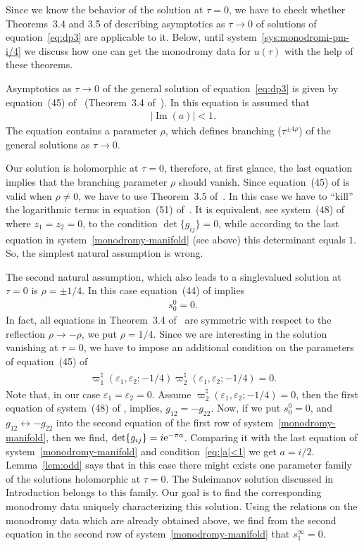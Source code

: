 \documentclass[pdftex]{sigma}
\numberwithin{equation}{section}
\begin{document}
Since we know the behavior of the solution at $\tau=0$, we have to check whether Theorems~3.4 and 3.5 of \cite{KV2004} describing asymptotics as $\tau\to0$
of solutions of equation~\eqref{eq:dp3} are applicable to it. Below, until system~\eqref{sys:monodromi-pm-i/4}
we discuss how one can get the monodromy data for $u(\tau)$ with the help of these theorems.

Asymptotics as $\tau\to0$ of the general solution of equation~\eqref{eq:dp3} is given by equation~(45)
of~\cite{KV2004} (Theorem~3.4 of~\cite{KV2004}). In this equation is assumed that
\begin{gather}\label{eq:|a|<1}
|\operatorname{Im}(a)|<1.
\end{gather}
The equation contains a parameter $\rho$, which defines branching ($\tau^{\pm4\rho}$) of
the general solutions as $\tau\to0$.

Our solution is holomorphic at $\tau=0$, therefore, at first glance,
the last equation implies that the branching parameter $\rho$ should vanish.
Since equation~(45) of \cite{KV2004} is valid when $\rho\neq0$, we have to use Theorem~3.5 of~\cite{KV2004}.
In this case we have to ``kill'' the logarithmic terms in equation~(51) of~\cite{KV2004}. It is equivalent,
see system~(48) of \cite{KV2004} where $z_1=z_2=0$, to the condition $\det\{g_{ij}\}=0$, while according to the last
equation in system~\eqref{monodromy-manifold} (see above) this determinant equals $1$. So, the simplest natural
assumption is wrong.

The second natural assumption, which also leads to a singlevalued solution at $\tau=0$ is $\rho=\pm1/4$.
In this case equation~(44) of \cite{KV2004} implies
\begin{gather*}%
s_0^0=0.
\end{gather*}
In fact, all equations in Theorem~3.4 of~\cite{KV2004} are symmetric with respect to the reflection $\rho\to-\rho$,
we put $\rho=1/4$. Since we are interesting in the solution vanishing at $\tau=0$, we have to impose an
additional condition on the parameters of equation~(45) of~\cite{KV2004}
\begin{gather*}
\varpi_1^\natural(\varepsilon_1,\varepsilon_2;-1/4)\varpi_2^\natural(\varepsilon_1,\varepsilon_2;-1/4)=0.
\end{gather*}
Note that, in our case $\varepsilon_1=\varepsilon_2=0$.
Assume $\varpi_2^\natural(\varepsilon_1,\varepsilon_2;-1/4)=0$, then the first equation of system~(48)
of \cite{KV2004}, implies, $g_{12}=-g_{22}$. Now, if we put $s_0^0=0$, and $g_{12}\leftrightarrow-g_{22}$
into the second equation of the first row of system~\eqref{monodromy-manifold}, then we find,
$\det\{g_{ij}\}=i{\rm e}^{-\pi a}$. Comparing it with the last equation of system~\eqref{monodromy-manifold}
and condition~\eqref{eq:|a|<1} we get $a=i/2$. Lemma~\ref{lem:odd} says that in this case there might exists
one parameter family of the solutions holomorphic at $\tau=0$. The Suleimanov solution discussed in Introduction
belongs to this family. Our goal is to find the corresponding monodromy data uniquely characterizing this solution.
Using the relations on the monodromy data which are already obtained above, we find from the second equation
in the second row of system~\eqref{monodromy-manifold} that $s_1^{\infty}=0$.
\end{document}
